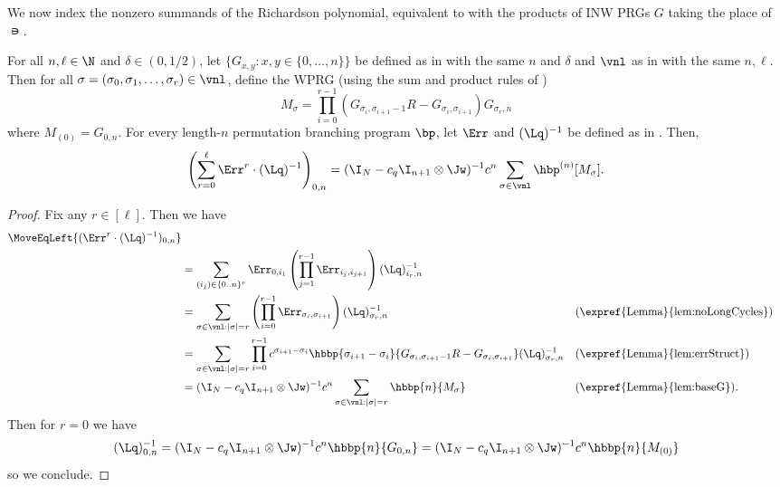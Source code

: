 We now index the nonzero summands of the Richardson polynomial, equivalent to  with the products of INW PRGs $G$ taking the place of $\nis$.
\begin{lemma}\label{lem:richardSummandsCycle}
For all $n,\ell \in \N$ and $\delta \in (0,1/2)$, let $\{G_{x,y}:x,y\in\{0,\dots,n\}\}$ be defined as in  with the same $n$ and $\delta$ and $\vnl$ as in  with the same $n,\ell$. Then for all $\sigma=(\sigma_0,\sigma_1,\dots,\sigma_r) \in \vnl$, define the WPRG (using the sum and product rules of 
%
 ) %
\[M_\sigma = \prod_{i=0}^{r-1}(G_{\sigma_i,\sigma_{i+1}-1}R-G_{\sigma_i,\sigma_{i+1}})G_{\sigma_r,n}\]
where $M_{(0)}=G_{0,n}$. For every length-$n$ permutation branching program $\bp$, let $\Err$ and $(\Lq)^{-1}$ be defined as in . Then,
\[\left(\sum_{r=0}^\ell\Err^{r}\cdot(\Lq)^{-1}\right)_{0,n} = (\I_N-c_q\I_{n+1}\otimes \Jw)^{-1}c^n \sum_{\sigma \in \vnl}\hbp^{(n)}[M_\sigma].\]
\end{lemma}
\begin{proof}
Fix any $r \in [\ell]$. %
Then we have  %
\begin{align*}
\MoveEqLeft{(\Err^{r}\cdot(\Lq)^{-1})_{0,n}} \\&= \sum_{(i_j) \in \{0..n\}^r} \Err_{0,i_1}\left(\prod_{j=1}^{r-1}\Err_{i_j,i_{j+1}}\right)(\Lq)^{-1}_{i_r,n}\\
&= \sum_{\sigma\in \vnl:|\sigma|=r}\left(\prod_{i=0}^{r-1}\Err_{\sigma_{i},\sigma_{i+1}}\right)(\Lq)^{-1}_{\sigma_r,n} && \text{(\expref{Lemma}{lem:noLongCycles})}\\
&= \sum_{\sigma\in \vnl:|\sigma|=r}\prod_{i=0}^{r-1}c^{\sigma_{i+1}-\sigma_i}\hbbp{\sigma_{i+1}-\sigma_i}{G_{\sigma_i,\sigma_{i+1}-1}R-G_{\sigma_i,\sigma_{i+1}}}(\Lq)^{-1}_{\sigma_r,n} 
&&\text{(\expref{Lemma}{lem:errStruct})}\\
&=(\I_N-c_q\I_{n+1}\otimes \Jw)^{-1}c^n \sum_{\sigma \in \vnl:|\sigma|=r}\hbbp{n}{M_\sigma} && \text{(\expref{Lemma}{lem:baseG})}.
\end{align*}
Then for $r=0$ we have
$$(\Lq)^{-1}_{0,n} = (\I_N-c_q\I_{n+1}\otimes \Jw)^{-1}c^n\hbbp{n}{G_{0,n}} = (\I_N-c_q\I_{n+1}\otimes \Jw)^{-1}c^n\hbbp{n}{M_{(0)}}$$
so we conclude.
\end{proof}

